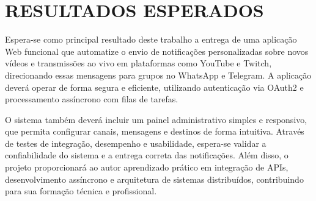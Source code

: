 



    

\section{RESULTADOS ESPERADOS}
\label{sec:resultados}

Espera-se como principal resultado deste trabalho a entrega de uma aplicação Web funcional que automatize o envio de notificações personalizadas sobre novos vídeos e transmissões ao vivo em plataformas como YouTube e Twitch, direcionando essas mensagens para grupos no WhatsApp e Telegram. A aplicação deverá operar de forma segura e eficiente, utilizando autenticação via OAuth2 e processamento assíncrono com filas de tarefas.

O sistema também deverá incluir um painel administrativo simples e responsivo, que permita configurar canais, mensagens e destinos de forma intuitiva. Através de testes de integração, desempenho e usabilidade, espera-se validar a confiabilidade do sistema e a entrega correta das notificações. Além disso, o projeto proporcionará ao autor aprendizado prático em integração de APIs, desenvolvimento assíncrono e arquitetura de sistemas distribuídos, contribuindo para sua formação técnica e profissional.


